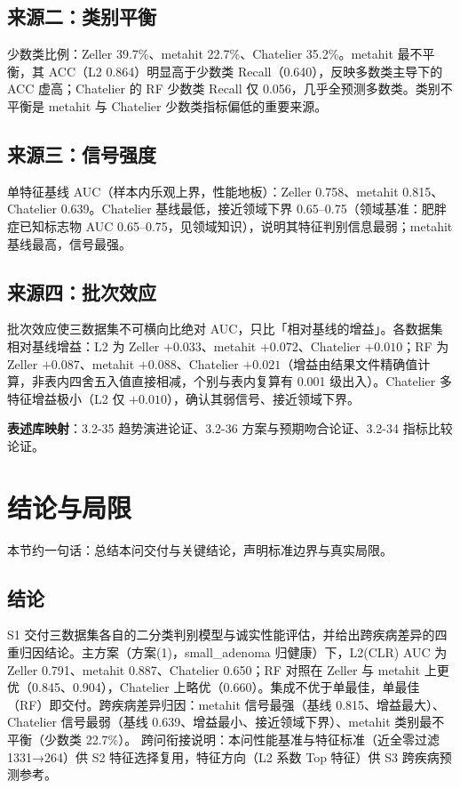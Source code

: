 \documentclass{internal-report}
\begin{document}
\subsection{来源二：类别平衡}
少数类比例：Zeller 39.7\%、metahit 22.7\%、Chatelier 35.2\%。metahit 最不平衡，其 ACC（L2 0.864）明显高于少数类 Recall（0.640），反映多数类主导下的 ACC 虚高；Chatelier 的 RF 少数类 Recall 仅 0.056，几乎全预测多数类。类别不平衡是 metahit 与 Chatelier 少数类指标偏低的重要来源。

\subsection{来源三：信号强度}
单特征基线 AUC（样本内乐观上界，性能地板）：Zeller 0.758、metahit 0.815、Chatelier 0.639。Chatelier 基线最低，接近领域下界 0.65--0.75（领域基准：肥胖症已知标志物 AUC 0.65--0.75，见领域知识），说明其特征判别信息最弱；metahit 基线最高，信号最强。

\subsection{来源四：批次效应}
批次效应使三数据集不可横向比绝对 AUC，只比「相对基线的增益」。各数据集相对基线增益：L2 为 Zeller $+0.033$、metahit $+0.072$、Chatelier $+0.010$；RF 为 Zeller $+0.087$、metahit $+0.088$、Chatelier $+0.021$（增益由结果文件精确值计算，非表内四舍五入值直接相减，个别与表内复算有 0.001 级出入）。Chatelier 多特征增益极小（L2 仅 $+0.010$），确认其弱信号、接近领域下界。

\textbf{表述库映射}：3.2-35 趋势演进论证、3.2-36 方案与预期吻合论证、3.2-34 指标比较论证。

\section{结论与局限}
\label{sec:conclusion}

本节约一句话：总结本问交付与关键结论，声明标准边界与真实局限。

\subsection{结论}
S1 交付三数据集各自的二分类判别模型与诚实性能评估，并给出跨疾病差异的四重归因结论。主方案（方案(1)，small\_adenoma 归健康）下，L2(CLR) AUC 为 Zeller 0.791、metahit 0.887、Chatelier 0.650；RF 对照在 Zeller 与 metahit 上更优（0.845、0.904），Chatelier 上略优（0.660）。集成不优于单最佳，单最佳（RF）即交付。跨疾病差异归因：metahit 信号最强（基线 0.815、增益最大）、Chatelier 信号最弱（基线 0.639、增益最小、接近领域下界）、metahit 类别最不平衡（少数类 22.7\%）。
跨问衔接说明：本问性能基准与特征标准（近全零过滤 1331→264）供 S2 特征选择复用，特征方向（L2 系数 Top 特征）供 S3 跨疾病预测参考。
\end{document}
